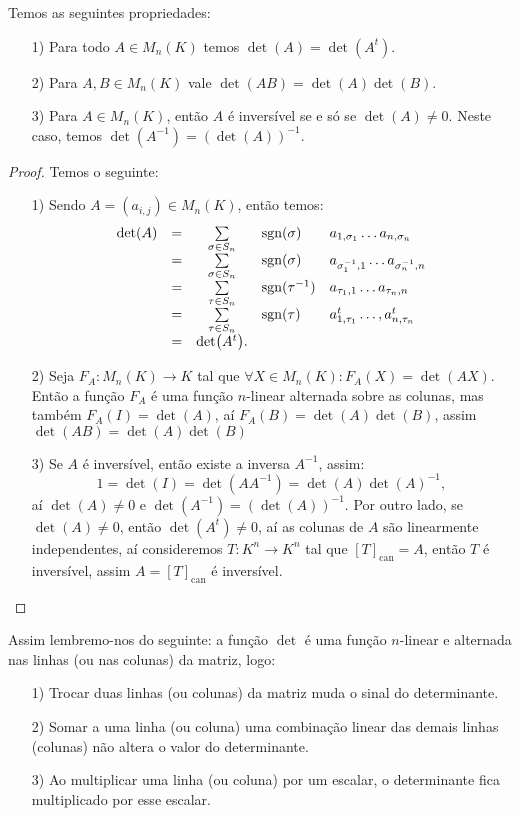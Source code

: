 \documentclass[11pt,twoside,a4paper]{book}
\begin{document}
\begin{proposicao}
Temos as seguintes propriedades:
\begin{itemize}
\item[1)] Para todo $A\in M_n(K)$ temos $\det(A)=\det(A^t)$.
\item[2)] Para $A,B\in M_n(K)$ vale $\det(AB)=\det(A)\det(B)$.
\item[3)] Para $A\in M_n(K)$, então $A$ é inversível se e só se $\det(A)\neq 0$. Neste caso, temos $\det(A^{-1})=(\det(A))^{-1}$.
\end{itemize}
\end{proposicao}
\begin{proof}
Temos o seguinte:
\begin{itemize}
\item[1)] Sendo $A=(a_{i,j})\in M_n(K)$, então temos:
\[
\begin{array}{rccll}
\det(A)&=&\sum\limits_{\sigma\in S_n}&{\rm sgn}(\sigma)&a_{1,\sigma_1}\dots a_{n,\sigma_n}\\&=&\sum\limits_{\sigma\in S_n}&{\rm sgn}(\sigma)&a_{\sigma^{-1}_1,1}\dots a_{\sigma^{-1}_n,n}\\&=&\sum\limits_{\tau\in S_n}&{\rm sgn}(\tau^{-1})&a_{\tau_1,1}\dots a_{\tau_n,n}\\&=&\sum\limits_{\tau\in S_n}&{\rm sgn}(\tau)&a^t_{1,\tau_1}\dots,a^t_{n,\tau_n}\\&=&\det(A^t).&&
\end{array}
\]
\item[2)] Seja $F_A:M_n(K)\rightarrow K$ tal que $\forall X\in M_n(K):F_A(X)=\det(AX)$. Então a função $F_A$ é uma função $n$-linear alternada sobre as colunas, mas também $F_A(I)=\det(A)$, aí $F_A(B)=\det(A)\det(B)$, assim $\det(AB)=\det(A)\det(B)$
\item[3)] Se $A$ é inversível, então existe a inversa $A^{-1}$, assim:
\[
1=\det(I)=\det(AA^{-1})=\det(A)\det(A)^{-1},
\]
aí $\det(A)\neq 0$ e $\det(A^{-1})=(\det(A))^{-1}$. Por outro lado, se $\det(A)\neq 0$, então $\det(A^t)\neq 0$, aí as colunas de $A$ são linearmente independentes, aí consideremos $T:K^n\rightarrow K^n$ tal que $[T]_{\mathrm{can}}=A$, então $T$ é inversível, assim $A=[T]_{\mathrm{can}}$ é inversível.
\end{itemize}
\end{proof}

\noindent
Assim lembremo-nos do seguinte: a função $\det$ é uma função $n$-linear e alternada nas linhas (ou nas colunas) da matriz, logo:
\begin{itemize}
\item[1)] Trocar duas linhas (ou colunas) da matriz muda o sinal do determinante.
\item[2)] Somar a uma linha (ou coluna) uma combinação linear das demais linhas (colunas) não altera o valor do determinante.
\item[3)] Ao multiplicar uma linha (ou coluna) por um escalar, o determinante fica multiplicado por esse escalar.
\end{itemize}
\end{document}
